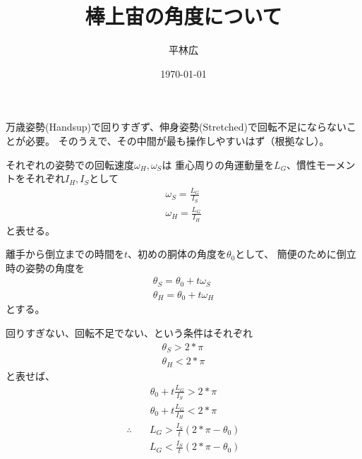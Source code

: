 \documentclass[a4paper,11pt]{jsarticle}
\begin{document}
\title{棒上宙の角度について}
\author{平林広}
\date{\today}
\maketitle

万歳姿勢(Handsup)で回りすぎず、伸身姿勢(Stretched)で回転不足にならないことが必要。
そのうえで、その中間が最も操作しやすいはず（根拠なし）。

それぞれの姿勢での回転速度$\omega_{H},\omega_{S}$は
重心周りの角運動量を$L_G$、慣性モーメントをそれぞれ$I_{H},I_{S}$として
\begin{eqnarray}
  \omega_{S} = \frac{L_G}{I_{S}} \\
  \omega_{H} = \frac{L_G}{I_{H}}
\end{eqnarray}
と表せる。

離手から倒立までの時間を$t$、初めの胴体の角度を$\theta_0$として、
簡便のために倒立時の姿勢の角度を
\begin{eqnarray}
  \theta_S = \theta_0 + t \omega_S \\
  \theta_H = \theta_0 + t \omega_H
\end{eqnarray}
とする。

回りすぎない、回転不足でない、という条件はそれぞれ
\begin{eqnarray}
  \theta_S > 2 * \pi \\
  \theta_H < 2 * \pi
\end{eqnarray}
と表せば、
\begin{eqnarray*}
  \theta_0 + t \frac{L_G}{I_S} > 2 * \pi \\
  \theta_0 + t \frac{L_G}{I_H} < 2 * \pi
\end{eqnarray*}
\begin{align*}
  \therefore & \quad L_G > \frac{I_S}{t}(2 *\pi-\theta_0)\\
  & \quad L_G < \frac{I_S}{t}(2 *\pi-\theta_0)\\
\end{align*}
\end{document}
